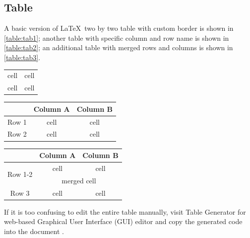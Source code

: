 \subsection{Table}

A basic version of \LaTeX\ two by two table with custom border is shown in \autoref{table:tab1}; another table with specific column and row name is shown in \autoref{table:tab2}; an additional table with merged rows and columns is shown in \autoref{table:tab3}.

\begin{center}
    \label{table:tab1}
    \begin{tabular}{ c | c }
        \hline
        cell & cell \\
        cell & cell \\
        \hline
    \end{tabular}
\end{center}


\begin{center}
    \label{table:tab2}
    \begin{tabular}{ c | c c }
        \toprule
         & Column A & Column B \\
        \midrule
        Row 1 & cell & cell \\
        Row 2 & cell & cell \\
        \bottomrule
    \end{tabular}
\end{center}

\begin{center}
    \label{table:tab3}
    \begin{tabular}{ c | c c }
        \toprule
         & Column A & Column B \\
        \midrule
        \multirow[t]{2}{*}{Row 1-2} & cell & cell \\
                                    & \multicolumn{2}{c}{merged cell} \\
        Row 3 & cell & cell \\
        \bottomrule
    \end{tabular}
\end{center}

If it is too confusing to edit the entire table manually, visit Table Generator for web-based Graphical User Interface (GUI) editor and copy the generated code into the document \cite{table_gen}.

